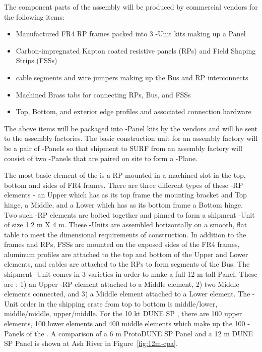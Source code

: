 The component parts of the  assembly will be produced by commercial vendors for the following items:
\begin{itemize}
\item Manufactured FR4 RP frames packed into 3 -Unit kits making up a  Panel
\item Carbon-impregnated Kapton coated resistive panels (RPs) and Field Shaping Strips (FSSs)
\item {} cable segments and wire jumpers making up the   Bus and RP interconnects
\item Machined Brass tabs for connecting RPs,  Bus, and FSSs
\item Top, Bottom, and exterior edge profiles and associated connection hardware
\end{itemize}
The above items will be packaged into -Panel kits by the vendors and will be sent to the assembly factories.  The basic construction unit for an assembly factory will be a pair of -Panels so that shipment to SURF from an assembly factory will consist of two -Panels that are paired on site to form a -Plane.

The most basic element of the  is a RP mounted in a machined slot in the top, bottom and sides of FR4 frames.  There are three different types of these -RP elements - an Upper which has as its top frame the  mounting bracket and Top  hinge, a Middle, and a Lower which has as its bottom frame a Bottom  hinge.  Two such -RP elements are bolted together and pinned to form a shipment -Unit of size 1.2 m X 4 m.  These -Units are assembled horizontally on a smooth, flat table to meet the dimensional requirements of  construction.  In addition to the frames and RPs, FSSs are mounted on the exposed sides of the FR4 frames, aluminum profiles are attached to the top and bottom of the Upper and Lower elements, and cables are attached to the RPs to form segments of the  Bus.  The shipment -Unit comes in 3 varieties in order to make a full 12 m tall  Panel.  These are : 1) an Upper -RP element attached to a Middle element, 2) two Middle elements connected, and 3) a Middle element attached to a Lower element.  The -Unit order in the shipping crate from top to bottom is middle/lower, middle/middle, upper/middle.  For the 10 kt DUNE SP , there are 100 upper elements, 100 lower elements and 400 middle elements which make up the 100 -Panels of the .
A comparison of a 6 m ProtoDUNE SP  Panel and a 12 m DUNE SP Panel is shown at Ash River in Figure~\ref{fig:12m-cpa}.

